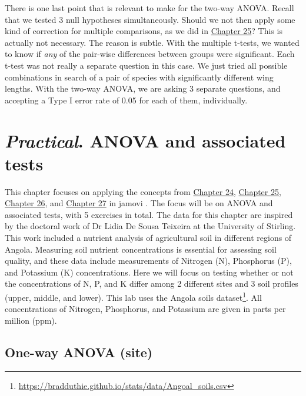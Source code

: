 \documentclass[
  openany]{scrbook}
\begin{document}
There is one last point that is relevant to make for the two-way ANOVA.
Recall that we tested 3 null hypotheses simultaneously.
Should we not then apply some kind of correction for multiple comparisons, as we did in \protect\hyperlink{Chapter_25}{Chapter 25}?
This is actually not necessary.
The reason is subtle.
With the multiple t-tests, we wanted to know if \emph{any} of the pair-wise differences between groups were significant.
Each t-test was not really a separate question in this case.
We just tried all possible combinations in search of a pair of species with significantly different wing lengths.
With the two-way ANOVA, we are asking 3 separate questions, and accepting a Type I error rate of 0.05 for each of them, individually.

\hypertarget{Chapter_28}{%
\chapter{\texorpdfstring{\emph{Practical}. ANOVA and associated tests}{Practical. ANOVA and associated tests}}\label{Chapter_28}}

This chapter focuses on applying the concepts from \protect\hyperlink{Chapter_24}{Chapter 24}, \protect\hyperlink{Chapter_25}{Chapter 25}, \protect\hyperlink{Chapter_26}{Chapter 26}, and \protect\hyperlink{Chapter_27}{Chapter 27} in jamovi \citep{Jamovi2022}.
The focus will be on ANOVA and associated tests, with 5 exercises in total.
The data for this chapter are inspired by the doctoral work of Dr Lidia De Sousa Teixeira at the University of Stirling.
This work included a nutrient analysis of agricultural soil in different regions of Angola.
Measuring soil nutrient concentrations is essential for assessing soil quality, and these data include measurements of Nitrogen (N), Phosphorus (P), and Potassium (K) concentrations.
Here we will focus on testing whether or not the concentrations of N, P, and K differ among 2 different sites and 3 soil profiles (upper, middle, and lower).
This lab uses the Angola soils dataset\footnote{\href{https://bradduthie.github.io/stats/data/Angola_soils.csv}{https://bradduthie.github.io/stats/data/Angoal\_soils.csv}}.
All concentrations of Nitrogen, Phosphorus, and Potassium are given in parts per million (ppm).

\hypertarget{one-way-anova-site}{%
\section{One-way ANOVA (site)}\label{one-way-anova-site}}
\end{document}
